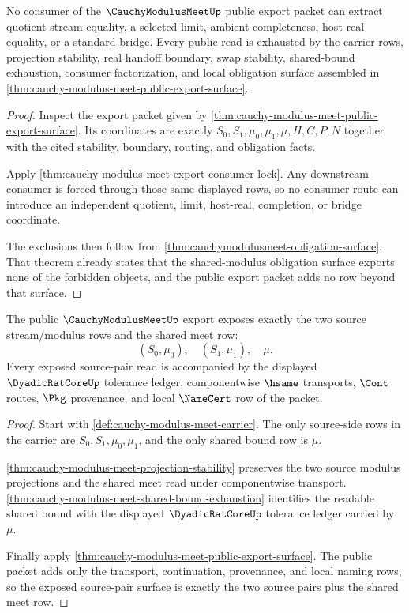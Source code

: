 \begin{theorem}
\label{thm:cauchy-modulus-meet-export-non-escape}
No consumer of the $\CauchyModulusMeetUp$ public export packet can extract quotient stream equality, a selected limit, ambient completeness, host real equality, or a standard bridge. Every public read is exhausted by the carrier rows, projection stability, real handoff boundary, swap stability, shared-bound exhaustion, consumer factorization, and local obligation surface assembled in \autoref{thm:cauchy-modulus-meet-public-export-surface}.
\end{theorem}
\begin{proof}
Inspect the export packet given by \autoref{thm:cauchy-modulus-meet-public-export-surface}. Its coordinates are exactly $S_0,S_1,\mu_0,\mu_1,\mu,H,C,P,N$ together with the cited stability, boundary, routing, and obligation facts.

Apply \autoref{thm:cauchy-modulus-meet-export-consumer-lock}. Any downstream consumer is forced through those same displayed rows, so no consumer route can introduce an independent quotient, limit, host-real, completion, or bridge coordinate.

The exclusions then follow from \autoref{thm:cauchymodulusmeet-obligation-surface}. That theorem already states that the shared-modulus obligation surface exports none of the forbidden objects, and the public export packet adds no row beyond that surface.
\end{proof}

\begin{theorem}
\label{thm:cauchy-modulus-meet-source-pair-exposure}
The public $\CauchyModulusMeetUp$ export exposes exactly the two source stream/modulus rows and the shared meet row:
$$
(S_0,\mu_0),\quad (S_1,\mu_1),\quad \mu.
$$
Every exposed source-pair read is accompanied by the displayed $\DyadicRatCoreUp$ tolerance ledger, componentwise $\hsame$ transports, $\Cont$ routes, $\Pkg$ provenance, and local $\NameCert$ row of the packet.
\end{theorem}
\begin{proof}
Start with \autoref{def:cauchy-modulus-meet-carrier}. The only source-side rows in the carrier are $S_0,S_1,\mu_0,\mu_1$, and the only shared bound row is $\mu$.

\autoref{thm:cauchy-modulus-meet-projection-stability} preserves the two source modulus projections and the shared meet read under componentwise transport. \autoref{thm:cauchy-modulus-meet-shared-bound-exhaustion} identifies the readable shared bound with the displayed $\DyadicRatCoreUp$ tolerance ledger carried by $\mu$.

Finally apply \autoref{thm:cauchy-modulus-meet-public-export-surface}. The public packet adds only the transport, continuation, provenance, and local naming rows, so the exposed source-pair surface is exactly the two source pairs plus the shared meet row.
\end{proof}

